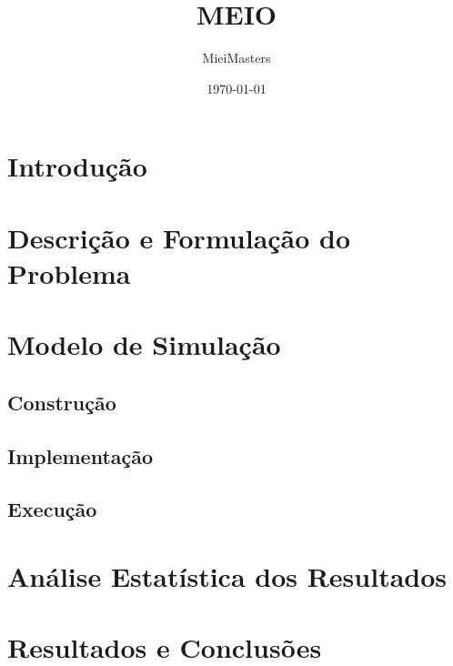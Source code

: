 \documentclass[a4paper]{article}
\title{MEIO}
\author{MieiMasters}
\date{\today}
\begin{document}
\maketitle

\newpage

\tableofcontents


\newpage

\section{Introdução}
\label{sec:intro}

\section{Descrição e Formulação do Problema}
\label{sec:descricao}

\section{Modelo de Simulação}
\label{sec:modelo}

\subsection{Construção}

\subsection{Implementação}

\subsection{Execução}

\section{Análise Estatística dos Resultados}

\section{Resultados e Conclusões}
\label{sec:conclusao}
\end{document}
